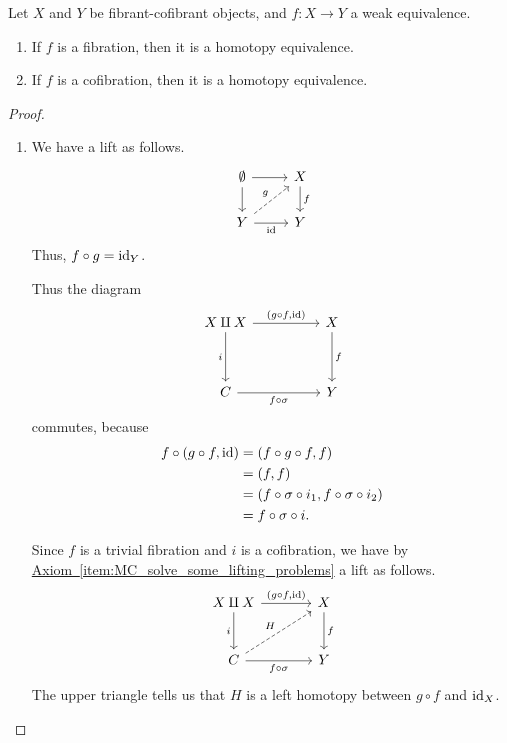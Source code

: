\documentclass[main.tex]{subfiles}
\begin{document}
\begin{lemma}
  \label{lemma:pre_whitehead}
  Let $X$ and $Y$ be fibrant-cofibrant objects, and $f\colon X \to Y$ a weak equivalence.
  \begin{enumerate}
    \item If $f$ is a fibration, then it is a homotopy equivalence.

    \item If $f$ is a cofibration, then it is a homotopy equivalence.
  \end{enumerate}
\end{lemma}
\begin{proof}
  \leavevmode
  \begin{enumerate}
    \item We have a lift as follows.
      \begin{equation*}
        \begin{tikzcd}
          \emptyset
          \arrow[r]
          \arrow[d]
          & X
          \arrow[d, "f"]
          \\
          Y
          \arrow[r, swap, "\id"]
          \arrow[ur, dashed, "g"]
          & Y
        \end{tikzcd}
      \end{equation*}
      Thus, $f \circ g = \mathrm{id}_{Y}$.

      Thus the diagram
      \begin{equation*}
        \begin{tikzcd}[row sep=huge, column sep=huge]
          X \amalg X
          \arrow[r, "{(g \circ f, \id)}"]
          \arrow[d, swap, "i"]
          & X
          \arrow[d, "f"]
          \\
          C
          \arrow[r, swap, "f \circ \sigma"]
          & Y
        \end{tikzcd}
      \end{equation*}
      commutes, because
      \begin{align*}
        f \circ (g \circ f, \mathrm{id}) &= (f \circ g \circ f, f) \\
        &= (f, f) \\
        &= (f \circ \sigma \circ i_{1}, f \circ \sigma \circ i_{2}) \\
        &= f \circ \sigma \circ i.
      \end{align*}

      Since $f$ is a trivial fibration and $i$ is a cofibration, we have by \hyperref[item:MC_solve_some_lifting_problems]{Axiom~\ref*{item:MC_solve_some_lifting_problems}} a lift as follows.
      \begin{equation*}
        \begin{tikzcd}[row sep=large, column sep=large]
          X \amalg X
          \arrow[r, "{(g \circ f, \id)}"]
          \arrow[d, swap, "i"]
          & X
          \arrow[d, "f"]
          \\
          C
          \arrow[ur, dashed, "H"]
          \arrow[r, swap, "f \circ \sigma"]
          & Y
        \end{tikzcd}
      \end{equation*}
      The upper triangle tells us that $H$ is a left homotopy between $g \circ f$ and $\mathrm{id}_{X}$.


\end{enumerate}
\end{proof}
\end{document}
